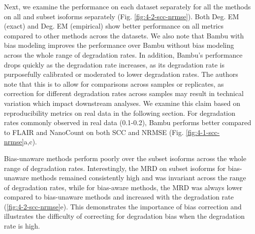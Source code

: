 Next, we examine the performance on each dataset separately for all the methods on all and subset isoforms separately (Fig. \ref{fig:4-2-scc-nrmse}). Both Deg. EM (exact) and Deg. EM (empirical) show better performance on all metrics compared to other methods across the datasets. We also note that Bambu with bias modeling improves the performance over Bambu without bias modeling across the whole range of degradation rates. In addition, Bambu's performance drops quickly as the degradation rate increases, as its degradation rate is purposefully calibrated or moderated to lower degradation rates. The authors note that this is to allow for comparisons across samples or replicates, as correction for different degradation rates across samples may result in technical variation which impact downstream analyses. We examine this claim based on reproducibility metrics on real data in the following section. For degradation rates commonly observed in real data (0.1-0.2), Bambu performs better compared to FLAIR and NanoCount on both SCC and NRMSE (Fig. \ref{fig:4-1-scc-nrmse}a,c). 

Bias-unaware methods perform poorly over the subset isoforms across the whole range of degradation rates. Interestingly, the MRD on subset isoforms for bias-unaware methods remained consistently high and was invariant across the range of degradation rates, while for bias-aware methods, the MRD was always lower compared to bias-unaware methods and increased with the degradation rate (\ref{fig:4-2-scc-nrmse}e). This demonstrates the importance of bias correction and illustrates the difficulty of correcting for degradation bias when the degradation rate is high.     

\newpage

